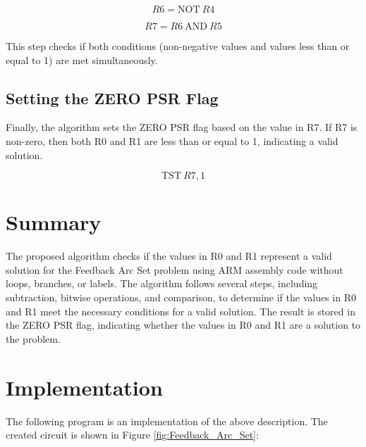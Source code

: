 \begin{equation}
R6 = \mathrm{NOT} \: R4
\end{equation}

\begin{equation}
R7 = R6 \: \mathrm{AND} \: R5
\end{equation}

This step checks if both conditions (non-negative values and values less than or equal to 1) are met simultaneously.

\subsection{Setting the ZERO PSR Flag}

Finally, the algorithm sets the ZERO PSR flag based on the value in R7. If R7 is non-zero, then both R0 and R1 are less than or equal to 1, indicating a valid solution.

\begin{equation}
\mathrm{TST} \: R7, 1
\end{equation}

\section{Summary}

The proposed algorithm checks if the values in R0 and R1 represent a valid solution for the Feedback Arc Set problem using ARM assembly code without loops, branches, or labels. The algorithm follows several steps, including subtraction, bitwise operations, and comparison, to determine if the values in R0 and R1 meet the necessary conditions for a valid solution. The result is stored in the ZERO PSR flag, indicating whether the values in R0 and R1 are a solution to the problem.



\section{Implementation}

The following program is an implementation of the above description. The created circuit is shown in Figure \ref{fig:Feedback_Arc_Set}:

